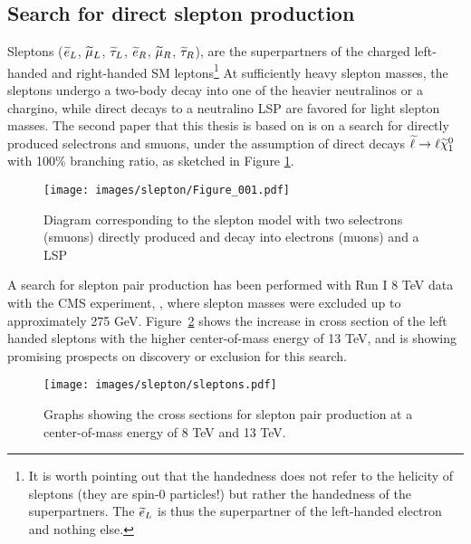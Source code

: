 \subsection*{Search for direct slepton production}\label{sec:searchSlepton}
\noindent\justify
Sleptons ($\widetilde{e}_{L}$, $\widetilde{\mu}_{L}$, $\widetilde{\tau}_{L}$, $\widetilde{e}_{R}$, $\widetilde{\mu}_{R}$, $\widetilde{\tau}_{R}$), are the superpartners of the charged left-handed and right-handed SM leptons\footnote{It is worth pointing out that the handedness does not refer to the helicity of sleptons (they are spin-0 particles!) but rather the handedness of the superpartners. The $\widetilde{e}_{L}$ is thus the superpartner of the left-handed electron and nothing else.} 
At sufficiently heavy slepton masses, the sleptons undergo a two-body decay into one of the heavier neutralinos or a chargino, while direct decays to a neutralino LSP are favored for light slepton masses.
The second paper that this thesis is based on is on a search for directly produced selectrons and smuons, under the assumption of direct decays $\widetilde{\ell}\to \ell\widetilde{\chi}^{0}_{1}$ with 100\% branching ratio, as sketched in Figure \ref{fig:feynmanSlepton}.
\begin{figure}[!htp]
\centering
\texttt{[image: images/slepton/Figure\_001.pdf]}
\caption{Diagram corresponding to the slepton model with two selectrons (smuons) directly produced and decay into electrons (muons) and a LSP} 
\label{fig:feynmanSlepton}
\end{figure}                                                                                                                                           
A search for slepton pair production has been performed with Run I 8 TeV data with the CMS experiment, \cite{Khachatryan:2014qwa}, where slepton masses were excluded up to approximately 275 GeV. 
Figure~\ref{sig:xsec} shows the increase in cross section of the left handed sleptons with the higher center-of-mass energy of 13 TeV, and is showing promising prospects on discovery or exclusion for this search.
\begin{figure}[!h]
\centering
\texttt{[image: images/slepton/sleptons.pdf]}
\caption{Graphs showing the cross sections for slepton pair production at a center-of-mass energy of 8 TeV and 13 TeV.}
\label{sig:xsec}
\end{figure}                                                                                                                                                               
